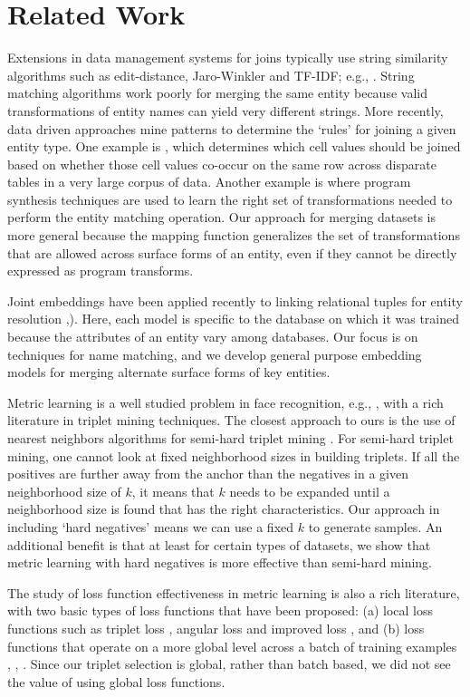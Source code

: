 \section{Related Work}
Extensions in data management systems for joins typically use string similarity algorithms such as edit-distance, Jaro-Winkler and TF-IDF; e.g., \cite{Cohen2003}.  String matching algorithms work poorly for merging the same entity because valid transformations of entity names can yield very different strings.  More recently, data driven approaches mine patterns to determine the `rules' for joining a given entity type.  One example is \cite{He:2015:SJS:2824032.2824036}, which determines which cell values should be joined based on whether those cell values co-occur on the same row across disparate tables in a very large corpus of data.  Another example is \cite{auto-join-joining-tables-leveraging-transformations} where program synthesis techniques are used to learn the right set of transformations needed to perform the entity matching operation.  Our approach for merging datasets is more general because the mapping function generalizes the set of transformations that are allowed across surface forms of an entity, even if they cannot be directly expressed as program transforms.

Joint embeddings have been applied recently to linking relational tuples for entity resolution \cite{Mudgal},\cite{Bordawekar18}).  Here, each model is specific to the database on which it was trained because the attributes of an entity vary among databases.  Our focus is on techniques for name matching, and we develop general purpose embedding models for merging alternate surface forms of key entities.  

Metric learning is a well studied problem in face recognition, e.g., \cite{DBLP:conf/cvpr/SchroffKP15}, with a rich literature in triplet mining techniques.  The closest approach to ours is the use of nearest neighbors algorithms for semi-hard triplet mining \cite{DBLP:journals/corr/KumarHC0D17}.  For semi-hard triplet mining, one cannot look at fixed neighborhood sizes in building triplets.  If all the positives are further away from the anchor than the negatives in a given neighborhood size of $k$, it means that $k$ needs to be expanded until a neighborhood size is found that has the right characteristics.  Our approach in including `hard negatives' means we can use a fixed $k$ to generate samples.  An additional benefit is that at least for certain types of datasets, we show that metric learning with hard negatives is more effective than semi-hard mining.

The study of loss function effectiveness in metric learning is also a rich literature, with two basic types of loss functions that have been proposed: (a) local loss functions such as triplet loss \cite{DBLP:conf/cvpr/SchroffKP15}, angular loss \cite{Zhang:2016:DML:3088616.3088665} and improved loss \cite{DBLP:journals/corr/abs-1708-01682}, and (b) loss functions that operate on a more global level across a batch of training examples \cite{NIPS2016_6200}, \cite{DBLP:conf/cvpr/SongXJS16}, \cite{songCVPR17}.   Since our triplet selection is global, rather than batch based, we did not see the value of using global loss functions.
